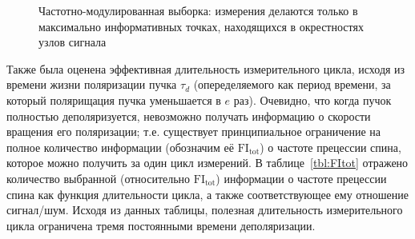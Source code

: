 \begin{figure}[H]\centering
	\begin{minipage}{.6\linewidth}
	\end{minipage}%
	\begin{minipage}{.4\linewidth}
	\caption{Частотно-модулированная выборка: измерения делаются только в максимально информативных точках,
		находящихся в окрестностях узлов сигнала\label{fig:modulated_sampling}}
	\end{minipage}
\end{figure}

Также была оценена эффективная длительность измерительного цикла, 
исходя из времени жизни поляризации пучка  $\tau_d$ (опеределяемого как период времени, 
за который полярищация пучка уменьшается в $e$ раз). Очевидно, что когда пучок полностью деполяризуется, 
невозможно получать информацию о скорости вращения его поляризации; т.е. 
существует принципиальное ограничение на полное количество информации (обозначим её $\mathrm{FI_{tot}}$) 
о частоте прецессии спина, которое можно получить за один цикл измерений.
В таблице~\ref{tbl:FItot} отражено количество выбранной (относительно $\mathrm{FI_{tot}}$) информации 
о частоте прецессии спина как функция длительности цикла, а также соответствующее ему отношение
сигнал/шум. Исходя из данных таблицы, полезная длительность измерительного цикла 
ограничена тремя постоянными времени деполяризации.

